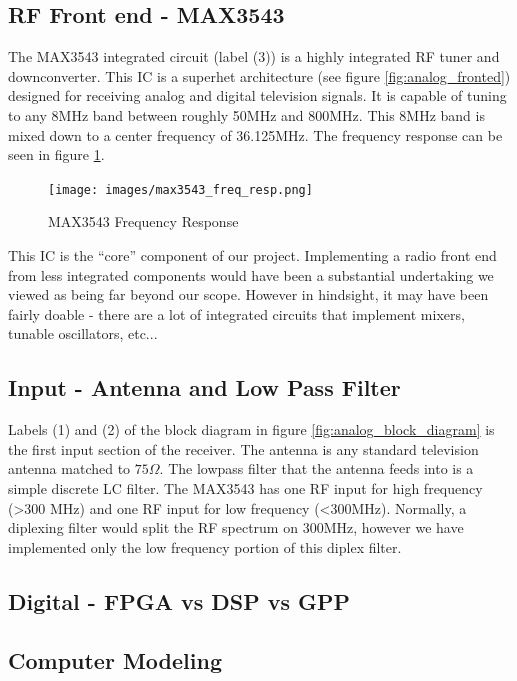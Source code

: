 \documentclass[a4paper, 12pt, notitlepage]{article}
\begin{document}
\subsection{RF Front end - MAX3543}
The MAX3543 integrated circuit \cite{max3543} (label (3)) is a highly integrated RF tuner and downconverter.  This IC is a superhet architecture (see figure \ref{fig:analog_fronted}) designed for receiving analog and digital television signals.  It is capable of tuning to any 8MHz band between roughly 50MHz and 800MHz.  This 8MHz band is mixed down to a center frequency of 36.125MHz.  The frequency response can be seen in figure \ref{fig:max3543_freq_resp}.

\begin{figure}
  \texttt{[image: images/max3543\_freq\_resp.png]}
  \caption{MAX3543 Frequency Response}
  \label{fig:max3543_freq_resp}
\end{figure}

This IC is the ``core'' component of our project.  Implementing a radio front end from less integrated components would have been a substantial undertaking we viewed as being far beyond our scope.  However in hindsight, it may have been fairly doable - there are a lot of integrated circuits that implement mixers, tunable oscillators, etc...

\subsection{Input - Antenna and Low Pass Filter}
Labels (1) and (2) of the block diagram in figure \ref{fig:analog_block_diagram} is the first input section of the receiver.  The antenna is any standard television antenna matched to $75\Omega$.  The lowpass filter that the antenna feeds into is a simple discrete LC filter.  The MAX3543 has one RF input for high frequency (>300 MHz) and one RF input for low frequency (<300MHz).  Normally, a diplexing filter would split the RF spectrum on 300MHz, however we have implemented only the low frequency portion of this diplex filter.

\subsection{Digital - FPGA vs DSP vs GPP}
\subsection{Computer Modeling}
\label{sec:model}
\end{document}
